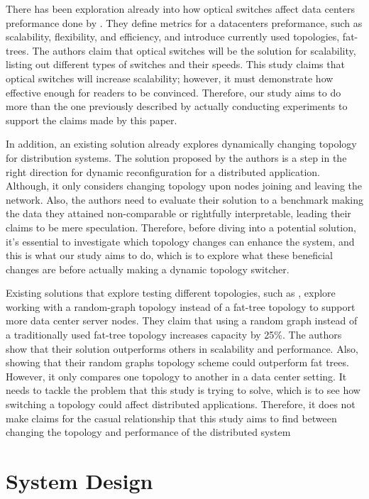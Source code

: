 There has been exploration already into how optical switches affect data centers preformance done by \cite{xue2023optical}. They define metrics for a datacenters preformance, such as scalability, flexibility, and efficiency, and introduce currently used topologies, fat-trees. The authors claim that optical switches will be the solution for scalability, listing out different types of switches and their speeds. This study claims that optical switches will increase scalability; however, it must demonstrate how effective enough for readers to be convinced. Therefore, our study aims to do more than the one previously described by actually conducting experiments to support the claims made by this paper.

	In addition, an existing solution already explores dynamically changing topology \cite{wen2018dynamic} for distribution systems. The solution proposed by the authors is a step in the right direction for dynamic reconfiguration for a distributed application. Although, it only considers changing topology upon nodes joining and leaving the network. Also, the authors need to evaluate their solution to a benchmark making the data they attained non-comparable or rightfully interpretable, leading their claims to be mere speculation. Therefore, before diving into a potential solution, it's essential to investigate which topology changes can enhance the system, and this is what our study aims to do, which is to explore what these beneficial changes are before actually making a dynamic topology switcher.

Existing solutions that explore testing different topologies, such as \cite{singla2012jellyfish}, explore working with a random-graph topology instead of a fat-tree topology to support more data center server nodes. They claim that using a random graph instead of a traditionally used fat-tree topology increases capacity by 25\%. The authors show that their solution outperforms others in scalability and performance. Also, showing that their random graphs topology scheme could outperform fat trees. However, it only compares one topology to another in a data center setting. It needs to tackle the problem that this study is trying to solve, which is to see how switching a topology could affect distributed applications. Therefore, it does not make claims for the casual relationship that this study aims to find between changing the topology and performance of the distributed system


\section{System Design}


